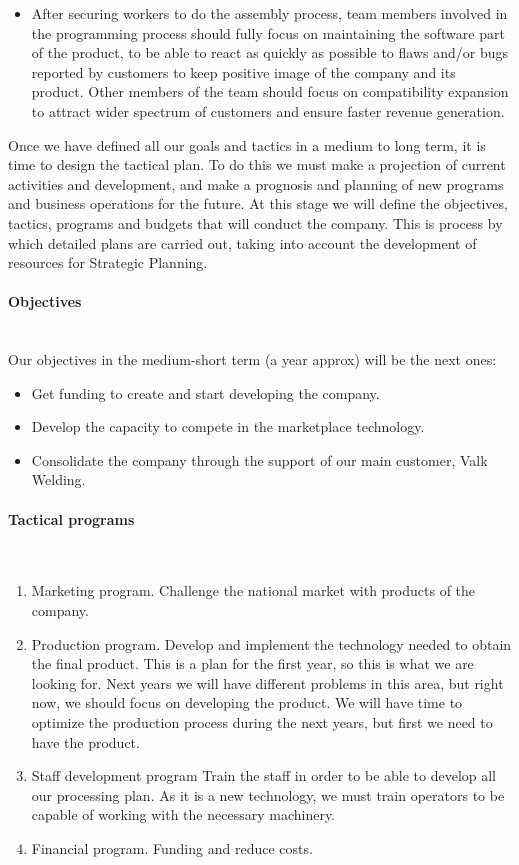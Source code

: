 \begin{itemize}
\item After securing workers to do the assembly process, team members involved in the programming process should fully focus on maintaining the software part of the product, to be able to react as quickly as possible to flaws and/or bugs reported by customers to keep positive image of the company and its product. Other members of the team should focus on compatibility expansion to attract wider spectrum of customers and ensure faster revenue generation.
\end{itemize}


Once we have defined all our goals and tactics in a medium to long term, it is time to design the tactical plan. To do this we must make a projection of current activities and development, and make a prognosis and planning of new programs and business operations for the future. At this stage we will define the objectives, tactics, programs and budgets that will conduct the company. This is process by which detailed plans are carried out, taking into account the development of resources for Strategic Planning.

\paragraph*{Objectives}~\\
Our objectives in the medium-short term (a year approx) will be the next ones:
\begin{itemize}[-]
\item Get funding to create and start developing the company.
\item Develop the capacity to compete in the marketplace technology.
\item Consolidate the company through the support of our main customer, Valk Welding.
\end{itemize}

\paragraph*{Tactical programs}~\\

\begin{enumerate}
\item Marketing program.
      Challenge the national market with products of the company.
\item Production program.
	Develop and implement the technology needed to obtain the final product.
	This is a plan for the first year, so this is what we are looking for. 
	Next years we will have different problems in this area, but right now, we should focus on developing the product. 
	We will have time to optimize the production process during the next years, but first we need to have the product.
\item Staff development program
	Train the staff in order to be able to develop all our processing plan.
	As it is a new technology, we must train operators to be capable of working with the necessary machinery.
\item Financial program.
      Funding and reduce costs.	
\end{enumerate}


